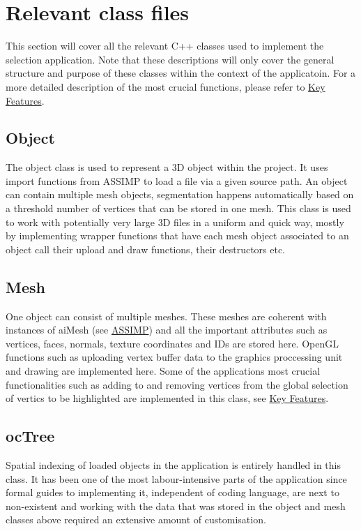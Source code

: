 \section{Relevant class files}
\label{sec:relevant_class_files}

This section will cover all the relevant C++ classes used to implement the selection application. Note that these descriptions will only cover the general structure and purpose of these classes within the context of the applicatoin. For a more detailed description of the most crucial functions, please refer to \hyperref[sec:key_features]{Key Features}.

\subsection{Object}
\label{sec:object}

The object class is used to represent a 3D object within the project. It uses import functions from ASSIMP to load a file via a given source path. An object can contain multiple mesh objects, segmentation happens automatically based on a threshold number of vertices that can be stored in one mesh. This class is used to work with potentially very large 3D files in a uniform and quick way, mostly by implementing wrapper functions that have each mesh object associated to an object call their upload and draw functions, their destructors etc.

\subsection{Mesh}
\label{sec:mesh}

One object can consist of multiple meshes. These meshes are coherent with instances of aiMesh (see \hyperref[sec:assimp]{ASSIMP}) and all the important attributes such as vertices, faces, normals, texture coordinates and IDs are stored here. OpenGL functions such as uploading vertex buffer data to the graphics proccessing unit and drawing are implemented here. Some of the applications most crucial functionalities such as adding to and removing vertices from the global selection of vertics to be highlighted are implemented in this class, see \hyperref[sec:key_features]{Key Features}.

\subsection{ocTree}
\label{sec:octree}
Spatial indexing of loaded objects in the application is entirely handled in this class. It has been one of the most labour-intensive parts of the application since formal guides to implementing it, independent of coding language, are next to non-existent and working with the data that was stored in the object and mesh classes above required an extensive amount of customisation.

